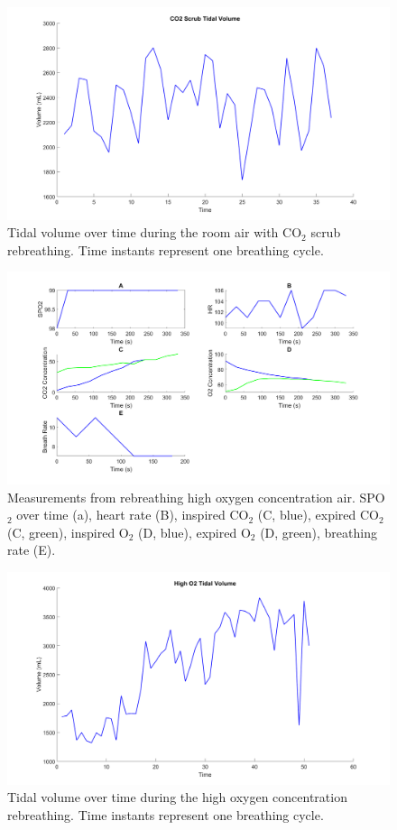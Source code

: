 \documentclass[12pt]{article}
\newcommand{\coo}{CO$_2$}
\newcommand{\oo}{O$_2$}
\newcommand{\spo}{SPO$_2$}
\begin{document}
\begin{figure}[H]
	
	\centering
	\includegraphics[width = .8\textwidth]{Figures/room_2.png}
	\caption{Tidal volume over time during the room air with \coo{} scrub rebreathing. Time instants represent one breathing cycle.}
	\label{fig:R2}
\end{figure}

\begin{figure}[H]
	
	\centering
	\includegraphics[width = .8\textwidth]{Figures/Higho2_1.png}
	\caption{Measurements from rebreathing high oxygen concentration air. \spo{} over time (a), heart rate (B), inspired \coo{} (C, blue), expired \coo{} (C, green), inspired \oo{} (D, blue), expired \oo{} (D, green), breathing rate (E).}
	\label{fig:O1}
\end{figure}

\begin{figure}[H]
	
	\centering
	\includegraphics[width = .8\textwidth]{Figures/Higho2_2.png}
	\caption{Tidal volume over time during the high oxygen concentration rebreathing. Time instants represent one breathing cycle.}
	\label{fig:O2}
\end{figure}
\end{document}
